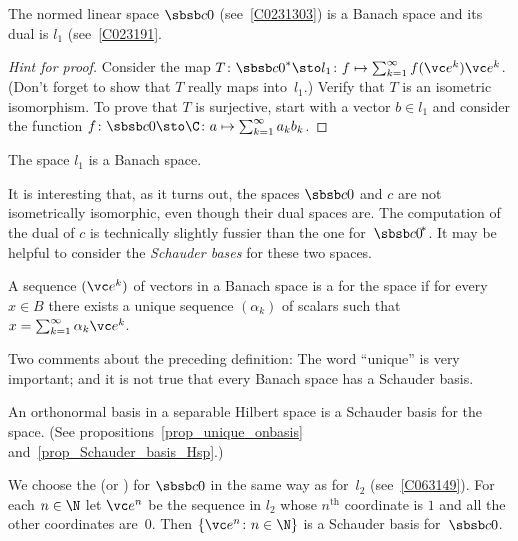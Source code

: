 \begin{exam}\label{exam_dual_C0} The normed linear space $\sbsb c0$ (see~\ref{C0231303})
is a Banach space and its dual is $l_1$ (see~\ref{C023191}.
\end{exam}

\begin{proof}[\emph{Hint for proof}] Consider the map
$T\colon {\sbsb c0}^* \sto l_1\colon f \mapsto \sum_{k=1}^\infty f(\vc e^k)\vc e^k$.
(Don't forget to show that $T$ really maps into~$l_1$.) Verify that $T$ is an isometric isomorphism.
To prove that $T$ is surjective, start with a vector $b \in l_1$ and consider the function
$f\colon \sbsb c0 \sto \C\colon a \mapsto \sum_{k=1}^\infty a_kb_k$.    \ns
\end{proof}

\begin{cor} The space $l_1$ is a
Banach space.
\end{cor}

It is interesting that, as it turns out, the spaces $\sbsb c0$ and $c$ are not isometrically isomorphic,
even though their dual spaces are.  The computation of the dual of $c$ is technically slightly fussier than
the one for~${\sbsb c0}^{\!*}$.  It may be helpful to consider the \emph{Schauder bases} for these two spaces.

\begin{defn} A sequence $(\vc e^k)$ of vectors in a Banach space is a
 for the space if for every $x \in B$ there exists a unique sequence $(\alpha_k)$ of
scalars such that $x = \sum_{k=1}^\infty \alpha_k \vc e^k$.
\end{defn}

Two comments about the preceding definition: The word ``unique'' is very important; and it is not true that
every Banach space has a Schauder basis.

\begin{exam} An orthonormal basis in a separable Hilbert space is a Schauder basis for the space.  (See
propositions~\ref{prop_unique_onbasis} and~\ref{prop_Schauder_basis_Hsp}.)
\end{exam}

\begin{exam}\label{exam_dual_c0} We choose the
 (or
)  for $\sbsb c0$ in the same way as for~$l_2$ (see~\ref{C063149}).
For each $n \in \N$ let $\vc e^n$ be the sequence in $l_2$ whose $n^{\text{th}}$ coordinate is $1$
and all the other coordinates are~$0$. Then $\{\vc e^n\colon n \in \N\}$ is a Schauder basis
for~$\sbsb c0$.
\end{exam}

